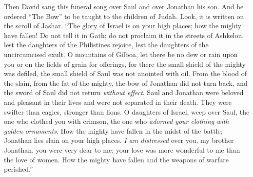 \begin{biblechapter}
 Then David sang this funeral song over Saul and over Jonathan his son.
\verse And he ordered “The Bow” to be taught to the children of Judah. Look, it is written on the scroll of Jashar.
\verse “The glory of Israel is on your high places; how the mighty have fallen!
\verse Do not tell it in Gath; do not proclaim it in the streets of Ashkelon, 
lest the daughters of the Philistines rejoice, 
lest the daughters of the uncircumcised exult.
\verse O mountains of Gilboa, let there be no dew or rain upon you 
or on the fields of grain for offerings, 
for there the small shield of the mighty was defiled, 
the small shield of Saul was not anointed with oil.
\verse From the blood of the slain, from the fat of the mighty, 
the bow of Jonathan did not turn back, 
and the sword of Saul did not return \textit{without effect}.
\verse Saul and Jonathan were beloved and pleasant in their lives 
and were not separated in their death. 
They were swifter than eagles, stronger than lions.
\verse O daughters of Israel, weep over Saul, 
the one who clothed you with crimson, 
the one who \textit{adorned your clothing with golden ornaments}.
\verse How the mighty have fallen in the midst of the battle; 
Jonathan lies slain on your high places.
\verse \textit{I am distressed} over you, my brother Jonathan. 
you were very dear to me; 
your love was more wonderful to me than the love of women.
\verse How the mighty have fallen and the weapons of warfare perished.”
\end{biblechapter}

